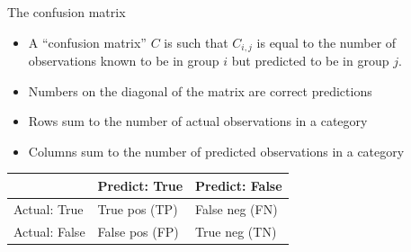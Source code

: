 \documentclass[mathserif, aspectratio=169, xcolor=table]{beamer}
\begin{document}
\begin{frame}{The confusion matrix}
	\begin{itemize}
		\item A ``confusion matrix'' $C$ is such that $C_{i,j}$ is equal to the number of observations known to be in group $i$ but predicted to be in group $j$.
		\item Numbers on the diagonal of the matrix are correct predictions
		\item Rows sum to the number of actual observations in a category
		\item Columns sum to the number of predicted observations in a category
	\end{itemize}

\begin{table}[]
\begin{tabular}{l|l|l|}
\cline{2-3}
                                               & \cellcolor[HTML]{EFEFEF} Predict: True & \cellcolor[HTML]{EFEFEF} Predict: False \\ \hline
\multicolumn{1}{|l|}{\cellcolor[HTML]{EFEFEF}Actual: True} &      True pos (TP)                    &                False neg (FN)          \\ \hline
\multicolumn{1}{|l|}{\cellcolor[HTML]{EFEFEF}Actual: False} &           False pos (FP)              &               True neg (TN)           \\ \hline
\end{tabular}
\end{table}

\end{frame}
\end{document}
